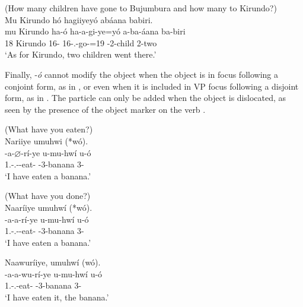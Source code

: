 \documentclass[output=paper]{langscibook}
\begin{document}
\z

\ea
\label{bkm:Ref75179462}
(How many children have gone to Bujumbura and how many to Kirundo?)\\
Mu  Kirundo hó hagiiyeyó abáana babiri.\\
\gll
mu  Kirundo  ha-ó  ha-a-gi-ye=yó  a-ba-áana  ba-biri\\
18  Kirundo  16-\CM{}  16\SM{}-\N{}.\PST{}-go-\PFV{}=19  \AUG{}-2-child  2-two\\
\glt
‘As for Kirundo, two children went there.’\\

\z

Finally, -\textit{ó} cannot modify the object when the object is in focus following a conjoint form, as in , or even when it is included in VP focus following a disjoint form, as in . The particle can only be added when the object is dislocated, as seen by the presence of the object marker on the verb .

\ea
\label{bkm:Ref75180460}
(What have you eaten?)\\
Nariiye umuhwi (*wó).\\
\gll
\N{}-a-$\varnothing$-rí-ye  u-mu-hwí  u-ó\\
1\SG.\SM-\N.\PST-\CJ{}-eat-\PFV{}  \AUG{}-3{}-banana  3-\CM{}\\
\glt
‘I have eaten a banana.’\\

\z

\ea
\label{bkm:Ref75180621}
(What have you done?)\\
Naaríiye umuhwí (*wó).\\
\gll
\N{}-a-a-rí-ye  u-mu-hwí  u-ó\\
1\SG.\SM-\N.\PST-\DJ{}-eat-\PFV{}  \AUG-{}3-banana  3-\CM{}\\
\glt
‘I have eaten a banana.’\\

\z

\ea
\label{bkm:Ref75180614}
Naawuríiye, umuhwí (wó).\\
\gll
\N{}-a-a-wu-rí-ye  u-mu-hwí  u-ó\\
1\SG.\SM-\N.\PST-\OM{}eat-\PFV{}  \AUG-{}3-banana  3-\CM{}\\
\glt
‘I have eaten it, the banana.’\\
\end{document}
